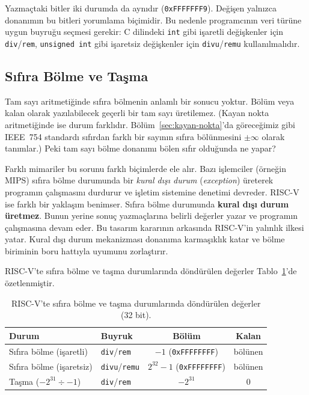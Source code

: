 \begin{ornek}[5.14]
Yazmaçtaki bitler iki durumda da aynıdır (\texttt{0xFFFFFFF9}). Değişen yalnızca donanımın bu bitleri yorumlama biçimidir. Bu nedenle programcının veri türüne uygun buyruğu seçmesi gerekir: C dilindeki \texttt{int} gibi işaretli değişkenler için \texttt{div}/\texttt{rem}, \texttt{unsigned int} gibi işaretsiz değişkenler için \texttt{divu}/\texttt{remu} kullanılmalıdır.
\end{ornek}


\subsection{Sıfıra Bölme ve Taşma}
\label{sec:sifira-bolme}

Tam sayı aritmetiğinde sıfıra bölmenin anlamlı bir sonucu yoktur. Bölüm veya kalan olarak yazılabilecek geçerli bir tam sayı üretilemez. (Kayan nokta aritmetiğinde ise durum farklıdır. Bölüm~\ref{sec:kayan-nokta}'da göreceğimiz gibi IEEE~754 standardı sıfırdan farklı bir sayının sıfıra bölünmesini $\pm\infty$ olarak tanımlar.) Peki tam sayı bölme donanımı bölen sıfır olduğunda ne yapar?

Farklı mimariler bu sorunu farklı biçimlerde ele alır. Bazı işlemciler (örneğin MIPS) sıfıra bölme durumunda bir \emph{kural dışı durum} (\emph{exception}) üreterek programın çalışmasını durdurur ve işletim sistemine denetimi devreder. RISC-V ise farklı bir yaklaşım benimser. Sıfıra bölme durumunda \textbf{kural dışı durum üretmez}. Bunun yerine sonuç yazmaçlarına belirli değerler yazar ve programın çalışmasına devam eder. Bu tasarım kararının arkasında RISC-V'in yalınlık ilkesi yatar. Kural dışı durum mekanizması donanıma karmaşıklık katar ve bölme biriminin boru hattıyla uyumunu zorlaştırır.

RISC-V'te sıfıra bölme ve taşma durumlarında döndürülen değerler Tablo~\ref{tab:sifira-bolme}'de özetlenmiştir.

\begin{table}[htbp]
\centering
\caption[Sıfıra bölme ve taşma sonuçları]{RISC-V'te sıfıra bölme ve taşma durumlarında döndürülen değerler (32 bit).}
\label{tab:sifira-bolme}
\small
\begin{tabular}{l l c c}
\toprule
\textbf{Durum} & \textbf{Buyruk} & \textbf{Bölüm} & \textbf{Kalan} \\
\midrule
Sıfıra bölme (işaretli) & \texttt{div}/\texttt{rem} & $-1$ (\texttt{0xFFFFFFFF}) & bölünen \\
Sıfıra bölme (işaretsiz) & \texttt{divu}/\texttt{remu} & $2^{32}-1$ (\texttt{0xFFFFFFFF}) & bölünen \\
Taşma ($-2^{31} \div -1$) & \texttt{div}/\texttt{rem} & $-2^{31}$ & $0$ \\
\bottomrule
\end{tabular}
\end{table}


